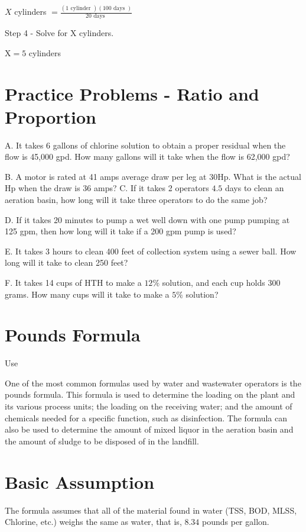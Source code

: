 \documentclass[10pt]{article}
\begin{document}
$X$ cylinders $=\frac{(1 \text { cylinder })(100 \text { days })}{20 \text { days }}$

Step 4 - Solve for $\mathrm{X}$ cylinders.

$\mathrm{X}=5$ cylinders

\section{Practice Problems - Ratio and Proportion}
A. It takes 6 gallons of chlorine solution to obtain a proper residual when the flow is 45,000 gpd. How many gallons will it take when the flow is 62,000 gpd?

B. A motor is rated at 41 amps average draw per leg at $30 \mathrm{Hp}$. What is the actual $\mathrm{Hp}$ when the draw is 36 amps? C. If it takes 2 operators $4.5$ days to clean an aeration basin, how long will it take three operators to do the same job?

D. If it takes 20 minutes to pump a wet well down with one pump pumping at 125 gpm, then how long will it take if a 200 gpm pump is used?

E. It takes 3 hours to clean 400 feet of collection system using a sewer ball. How long will it take to clean 250 feet?

F. It takes 14 cups of $\mathrm{HTH}$ to make a $12 \%$ solution, and each cup holds 300 grams. How many cups will it take to make a $5 \%$ solution?

\section{Pounds Formula}
Use

One of the most common formulas used by water and wastewater operators is the pounds formula. This formula is used to determine the loading on the plant and its various process units; the loading on the receiving water; and the amount of chemicals needed for a specific function, such as disinfection. The formula can also be used to determine the amount of mixed liquor in the aeration basin and the amount of sludge to be disposed of in the landfill.

\section{Basic Assumption}
The formula assumes that all of the material found in water (TSS, BOD, MLSS, Chlorine, etc.) weighs the same as water, that is, $8.34$ pounds per gallon.
\end{document}
